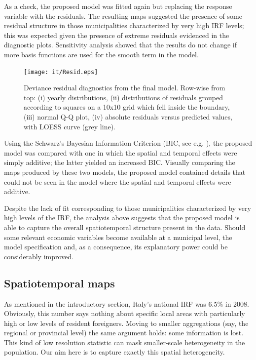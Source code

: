 As a check, the proposed model was fitted again but replacing the response variable with the residuals. The resulting maps suggested the presence of some residual structure in those municipalities characterized by very high IRF levels; this was expected given the presence of extreme residuals evidenced in the diagnostic plots. Sensitivity analysis showed that the results do not change if more basis functions are used for the smooth term in the model. 

\begin{figure}[tbp]
	\centering
		\texttt{[image: it/Resid.eps]}
	\caption{Deviance residual diagnostics from the final model. Row-wise from top: (i) yearly distributions, (ii) distributions of residuals grouped according to squares on a 10x10 grid which fell inside the boundary, (iii) normal Q-Q plot, (iv) absolute residuals versus predicted values, with LOESS curve (grey line).}
	\label{Resid}
\end{figure}

Using the Schwarz's Bayesian Information Criterion (BIC, see e.g. \cite[p. 286]{burnhamanderson}), the proposed model was compared with one in which the spatial and temporal effects were simply additive; the latter yielded an increased BIC. Visually comparing the maps produced by these two models, the proposed model contained details that could not be seen in the model where the spatial and temporal effects were additive.

Despite the lack of fit corresponding to those municipalities characterized by very high levels of the IRF, the analysis above suggests that the proposed model is able to capture the overall spatiotemporal structure present in the data. Should some relevant economic variables become available at a municipal level, the model specification and, as a consequence, its explanatory power could be considerably improved. 

\subsection{Spatiotemporal maps \label{STT}}

As mentioned in the introductory section, Italy's national IRF was 6.5\% in 2008. Obviously, this number says nothing about specific local areas with particularly high or low levels of resident foreigners. Moving to smaller aggregations (say, the regional or provincial level) the same argument holds: some information is lost. This kind of low resolution statistic can mask smaller-scale heterogeneity in the population. Our aim here is to capture exactly this spatial heterogeneity.

